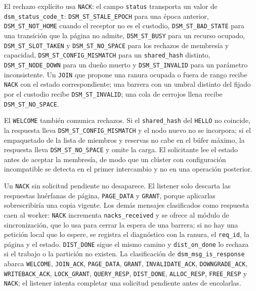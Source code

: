 El rechazo explícito usa \texttt{NACK}: el campo \texttt{status} transporta un valor de \texttt{dsm\_status\_code\_t}: \texttt{DSM\_ST\_STALE\_EPOCH} para una época anterior, \texttt{DSM\_ST\_NOT\_HOME} cuando el receptor no es el custodio, \texttt{DSM\_ST\_BAD\_STATE} para una transición que la página no admite, \texttt{DSM\_ST\_BUSY} para un recurso ocupado, \texttt{DSM\_ST\_SLOT\_TAKEN} y \texttt{DSM\_ST\_NO\_SPACE} para los rechazos de membresía y capacidad, \texttt{DSM\_ST\_CONFIG\_MISMATCH} para un \texttt{shared\_hash} distinto, \texttt{DSM\_ST\_NODE\_DOWN} para un dueño muerto y \texttt{DSM\_ST\_INVALID} para un parámetro inconsistente. Un \texttt{JOIN} que propone una ranura ocupada o fuera de rango recibe \texttt{NACK} con el estado correspondiente; una barrera con un umbral distinto del fijado por el custodio recibe \texttt{DSM\_ST\_INVALID}; una cola de cerrojos llena recibe \texttt{DSM\_ST\_NO\_SPACE}.

El \texttt{WELCOME} también comunica rechazos. Si el \texttt{shared\_hash} del \texttt{HELLO} no coincide, la respuesta lleva \texttt{DSM\_ST\_CONFIG\_MISMATCH} y el nodo nuevo no se incorpora; si el empaquetado de la lista de miembros y reservas no cabe en el búfer máximo, la respuesta lleva \texttt{DSM\_ST\_NO\_SPACE} y omite la carga. El solicitante lee el estado antes de aceptar la membresía, de modo que un clúster con configuración incompatible se detecta en el primer intercambio y no en una operación posterior.

Un \texttt{NACK} sin solicitud pendiente no desaparece. El listener solo descarta las respuestas huérfanas de página, \texttt{PAGE\_DATA} y \texttt{GRANT}, porque aplicarlas sobrescribiría una copia vigente. Los demás mensajes clasificados como respuesta caen al worker: \texttt{NACK} incrementa \texttt{nacks\_received} y se ofrece al módulo de sincronización, que lo usa para cerrar la espera de una barrera; si no hay una petición local que lo espere, se registra el diagnóstico con la ranura, el \texttt{req\_id}, la página y el estado. \texttt{DIST\_DONE} sigue el mismo camino y \texttt{dist\_on\_done} lo rechaza si el trabajo o la partición no existen. La clasificación de \texttt{dsm\_msg\_is\_response} abarca \texttt{WELCOME}, \texttt{JOIN\_ACK}, \texttt{PAGE\_DATA}, \texttt{GRANT}, \texttt{INVALIDATE\_ACK}, \texttt{DOWNGRADE\_ACK}, \texttt{WRITEBACK\_ACK}, \texttt{LOCK\_GRANT}, \texttt{QUERY\_RESP}, \texttt{DIST\_DONE}, \texttt{ALLOC\_RESP}, \texttt{FREE\_RESP} y \texttt{NACK}; el listener intenta completar una solicitud pendiente antes de encolarlas.

